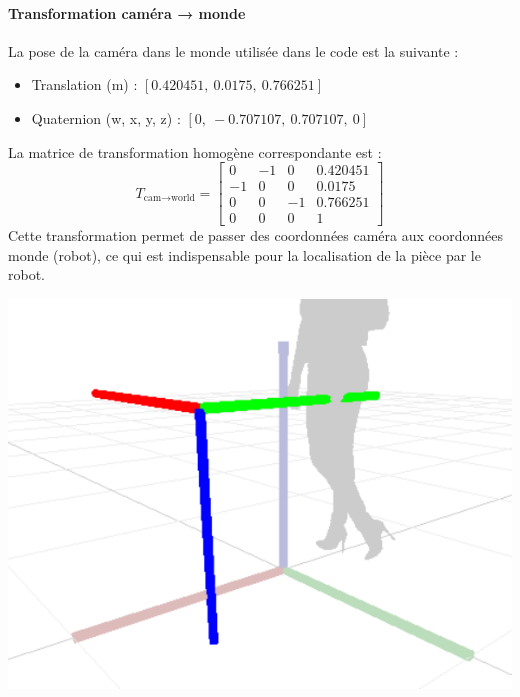 \begin{minipage}{0.55\textwidth}
    \paragraph{Transformation caméra → monde}
    La pose de la caméra dans le monde utilisée dans le code est la suivante :
    \begin{itemize}
        \item Translation (m) : $[0.420451,\ 0.0175,\ 0.766251]$
        \item Quaternion (w, x, y, z) : $[0,\ -0.707107,\ 0.707107,\ 0]$
    \end{itemize}
    {}%
    La matrice de transformation homogène correspondante est :
    \begin{equation*}
        T_{\text{cam} \to \text{world}} =
        \begin{bmatrix}
            0  & -1 & 0  & 0.420451 \\
            -1 & 0  & 0  & 0.0175   \\
            0  & 0  & -1 & 0.766251 \\
            0  & 0  & 0  & 1
        \end{bmatrix}
    \end{equation*}
    Cette transformation permet de passer des coordonnées caméra aux coordonnées monde (robot), ce qui est indispensable pour la localisation de la pièce par le robot.
\end{minipage}%
\hfill
\begin{minipage}{0.4\textwidth}
    \centering
    \includegraphics[width=0.95\linewidth]{assets/figures/Transform_example.png}
\end{minipage}


